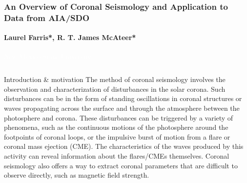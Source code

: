 \documentclass[t]{beamer}
\begin{document}
\begin{frame}[t]
    \frametitle{An Overview of Coronal Seismology and Application to Data
        from AIA/SDO}
    \framesubtitle{Laurel Farris*, R. T. James McAteer*}
    \begin{center}
        \textcolor{white}{\normalsize New Mexico State University}
    \end{center}
    \begin{block}{}
    \begin{columns}
        \begin{block}{Introduction \& motivation}
            The method of coronal seismology involves the observation and
            characterization of disturbances in the solar corona. Such disturbances
            can be in the form of standing oscillations in coronal structures or
            waves propagating across the surface and through the atmosphere
            between the photosphere and corona.
            These disturbances can be triggered by a variety of phenomena,
            such as the continuous motions of the photosphere around the footpoints
            of coronal loops, or the impulsive burst of motion from a flare or
            coronal mass ejection (CME). The characteristics of the waves produced
            by this activity can reveal information about the flares/CMEs themselves.
            Coronal seismology also offers a way to extract coronal parameters that
            are difficult to observe directly, such as magnetic field strength.
        \end{block}


\end{columns}
\end{block}
\end{frame}
\end{document}
